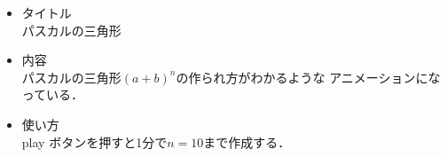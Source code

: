 \documentclass[20]{jarticle}
\begin{document}
\begin{itemize}
\item タイトル\\
パスカルの三角形
\item 内容\\
パスカルの三角形$(a+b)^n$の作られ方がわかるような
アニメーションになっている．


\item 使い方\\
play ボタンを押すと1分で$n=10$まで作成する．




\end{itemize}
\end{document}
